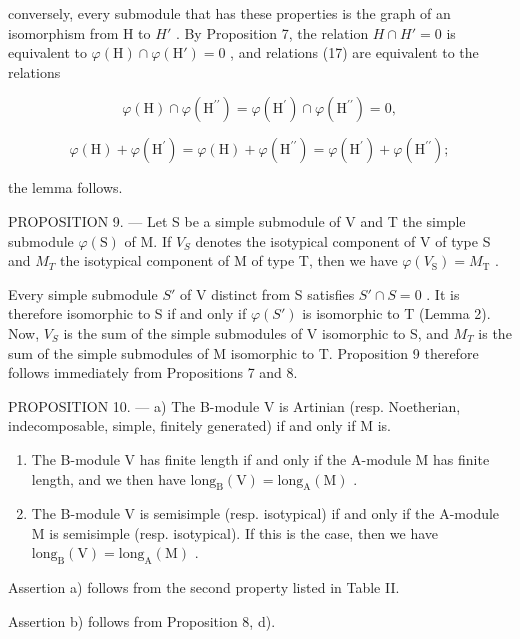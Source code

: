 conversely, every submodule that has these properties is the graph of an isomorphism from H to \(H'\) . By Proposition 7, the relation \(H \cap H' = 0\) is equivalent to \(\varphi(\mathrm{H}) \cap \varphi(\mathrm{H}') = 0\) , and relations (17) are equivalent to the relations

\[
\varphi (\mathrm{H}) \cap \varphi (\mathrm{H} ^ {\prime \prime}) = \varphi (\mathrm{H} ^ {\prime}) \cap \varphi (\mathrm{H} ^ {\prime \prime}) = 0,
\]

\[
\varphi (\mathrm{H}) + \varphi (\mathrm{H} ^ {\prime}) = \varphi (\mathrm{H}) + \varphi (\mathrm{H} ^ {\prime \prime}) = \varphi (\mathrm{H} ^ {\prime}) + \varphi (\mathrm{H} ^ {\prime \prime});
\]

the lemma follows.

PROPOSITION 9. --- Let S be a simple submodule of V and T the simple submodule \(\varphi(\mathrm{S})\) of M. If \(V_{S}\) denotes the isotypical component of V of type S and \(M_{T}\) the isotypical component of M of type T, then we have \(\varphi(V_{\mathrm{S}})=M_{\mathrm{T}}\) .

Every simple submodule \(S'\) of V distinct from S satisfies \(S' \cap S = 0\) . It is therefore isomorphic to S if and only if \(\varphi(S')\) is isomorphic to T (Lemma 2). Now, \(V_{S}\) is the sum of the simple submodules of V isomorphic to S, and \(M_{T}\) is the sum of the simple submodules of M isomorphic to T. Proposition 9 therefore follows immediately from Propositions 7 and 8.

PROPOSITION 10. --- a) The B-module V is Artinian (resp. Noetherian, indecomposable, simple, finitely generated) if and only if M is.

\begin{enumerate}
\def\labelenumi{\alph{enumi})}
\setcounter{enumi}{1}
\item
  The B-module V has finite length if and only if the A-module M has finite length, and we then have \(\mathrm{long}_{\mathrm{B}}(\mathrm{V}) = \mathrm{long}_{\mathrm{A}}(\mathrm{M})\) .
\item
  The B-module V is semisimple (resp. isotypical) if and only if the A-module M is semisimple (resp. isotypical). If this is the case, then we have \(\text{long}_{\text{B}}(\text{V}) = \text{long}_{\text{A}}(\text{M})\) .
\end{enumerate}

Assertion a) follows from the second property listed in Table II.

Assertion b) follows from Proposition 8, d).

